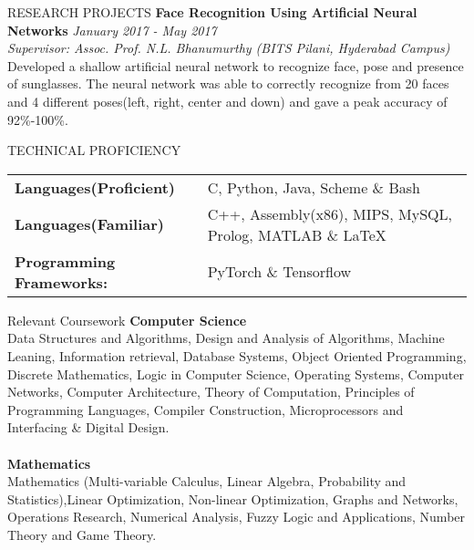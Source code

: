 \documentclass{resume} %
\begin{document}
\begin{rSection}{RESEARCH PROJECTS}
{\bf Face Recognition Using Artificial Neural Networks} \hfill {\it January 2017 - May 2017}\\ 
{\it Supervisor: Assoc. Prof. N.L. Bhanumurthy (BITS Pilani, Hyderabad Campus)}
\\ Developed a shallow artificial neural network to recognize face, pose and presence of sunglasses. The neural network was able to correctly recognize from 20 faces and 4 different poses(left, right, center and down) and gave a peak accuracy of 92\%-100\%.  

\end{rSection} 


\begin{rSection}{TECHNICAL PROFICIENCY}

\begin{tabular}{ @{} >{\bfseries}l @{\hspace{6ex}} l }
Languages(Proficient) & C, Python, Java, Scheme \& Bash\\ 
Languages(Familiar) & C++, Assembly(x86), MIPS, MySQL, Prolog, MATLAB \& LaTeX \\  
Programming Frameworks: & PyTorch \& Tensorflow  \\
\end{tabular}

\end{rSection}

\pagebreak
\begin{rSection}{Relevant Coursework}
{\bf Computer Science}\\
Data Structures and Algorithms, Design and Analysis of Algorithms, Machine Leaning, Information retrieval, Database Systems, Object Oriented Programming, Discrete Mathematics, Logic in Computer Science, Operating Systems, Computer Networks, Computer Architecture, Theory of Computation, Principles of Programming Languages, Compiler Construction, Microprocessors and Interfacing \& Digital Design.
\\ \\
{\bf Mathematics}\\
Mathematics (Multi-variable Calculus, Linear Algebra, Probability and Statistics),Linear Optimization, Non-linear Optimization, Graphs and Networks, Operations Research, Numerical Analysis, Fuzzy Logic and Applications, Number Theory and Game Theory.
\end{rSection}
\end{document}
